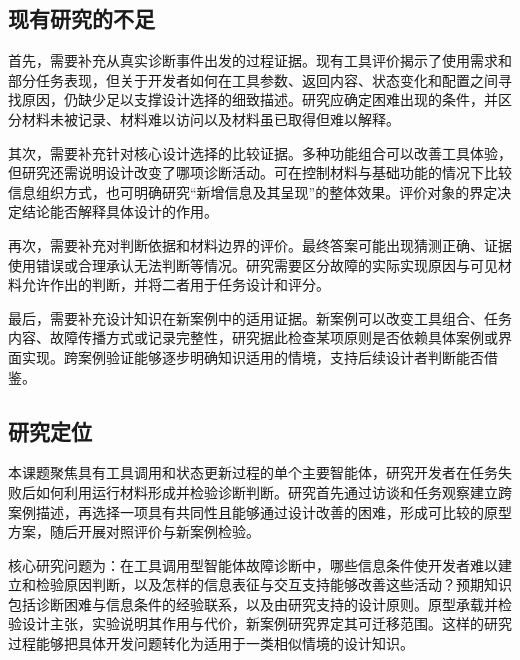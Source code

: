 \subsection{现有研究的不足}

首先，需要补充从真实诊断事件出发的过程证据。现有工具评价揭示了使用需求和部分任务表现，但关于开发者如何在工具参数、返回内容、状态变化和配置之间寻找原因，仍缺少足以支撑设计选择的细致描述。研究应确定困难出现的条件，并区分材料未被记录、材料难以访问以及材料虽已取得但难以解释。

其次，需要补充针对核心设计选择的比较证据。多种功能组合可以改善工具体验，但研究还需说明设计改变了哪项诊断活动。可在控制材料与基础功能的情况下比较信息组织方式，也可明确研究“新增信息及其呈现”的整体效果。评价对象的界定决定结论能否解释具体设计的作用。

再次，需要补充对判断依据和材料边界的评价。最终答案可能出现猜测正确、证据使用错误或合理承认无法判断等情况。研究需要区分故障的实际实现原因与可见材料允许作出的判断，并将二者用于任务设计和评分。

最后，需要补充设计知识在新案例中的适用证据。新案例可以改变工具组合、任务内容、故障传播方式或记录完整性，研究据此检查某项原则是否依赖具体案例或界面实现。跨案例验证能够逐步明确知识适用的情境，支持后续设计者判断能否借鉴。

\subsection{研究定位}

本课题聚焦具有工具调用和状态更新过程的单个主要智能体，研究开发者在任务失败后如何利用运行材料形成并检验诊断判断。研究首先通过访谈和任务观察建立跨案例描述，再选择一项具有共同性且能够通过设计改善的困难，形成可比较的原型方案，随后开展对照评价与新案例检验。

核心研究问题为：在工具调用型智能体故障诊断中，哪些信息条件使开发者难以建立和检验原因判断，以及怎样的信息表征与交互支持能够改善这些活动？预期知识包括诊断困难与信息条件的经验联系，以及由研究支持的设计原则。原型承载并检验设计主张，实验说明其作用与代价，新案例研究界定其可迁移范围。这样的研究过程能够把具体开发问题转化为适用于一类相似情境的设计知识。

